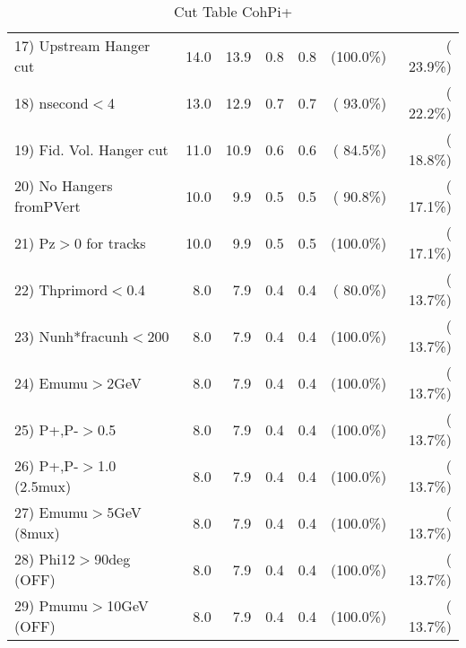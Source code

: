 \begin{table}[h!]
\begin{tabular}{||l||r|r|r|r|r|r||}
 17) Upstream Hanger cut  &         14.0 &         13.9 &          0.8 &          0.8 & (100.0\%) & ( 23.9\%) \\
 18) nsecond$<$4          &         13.0 &         12.9 &          0.7 &          0.7 & ( 93.0\%) & ( 22.2\%) \\
 19) Fid. Vol. Hanger cut &         11.0 &         10.9 &          0.6 &          0.6 & ( 84.5\%) & ( 18.8\%) \\
 20) No Hangers fromPVert &         10.0 &          9.9 &          0.5 &          0.5 & ( 90.8\%) & ( 17.1\%) \\
 21) Pz$>$0 for tracks    &         10.0 &          9.9 &          0.5 &          0.5 & (100.0\%) & ( 17.1\%) \\
 22) Thprimord$<$0.4      &          8.0 &          7.9 &          0.4 &          0.4 & ( 80.0\%) & ( 13.7\%) \\
 23) Nunh*fracunh$<$200   &          8.0 &          7.9 &          0.4 &          0.4 & (100.0\%) & ( 13.7\%) \\
 24) Emumu$>$2GeV         &          8.0 &          7.9 &          0.4 &          0.4 & (100.0\%) & ( 13.7\%) \\
 25) P+,P-$>$0.5          &          8.0 &          7.9 &          0.4 &          0.4 & (100.0\%) & ( 13.7\%) \\
 26) P+,P-$>$1.0 (2.5mux) &          8.0 &          7.9 &          0.4 &          0.4 & (100.0\%) & ( 13.7\%) \\
 27) Emumu$>$5GeV  (8mux) &          8.0 &          7.9 &          0.4 &          0.4 & (100.0\%) & ( 13.7\%) \\
 28) Phi12$>$90deg  (OFF) &          8.0 &          7.9 &          0.4 &          0.4 & (100.0\%) & ( 13.7\%) \\
 29) Pmumu$>$10GeV  (OFF) &          8.0 &          7.9 &          0.4 &          0.4 & (100.0\%) & ( 13.7\%) \\
 \hline
 \hline
 \end{tabular}
 \caption{Cut Table  CohPi+   }
 \label{tab-cutcohjpsi-mumu_nuecc}
 \end{table}
